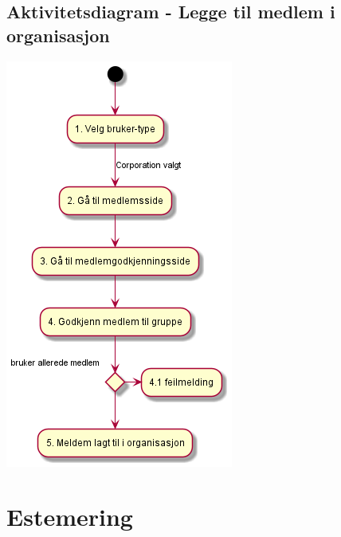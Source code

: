 \documentclass[12pt]{article}
\begin{document}
    \subsection{Aktivitetsdiagram - Legge til medlem i organisasjon}
    \includegraphics[max width=\textwidth]{bilder/diagrammer/aktivitet_medlem.png}

\section{Estemering}
\end{document}
